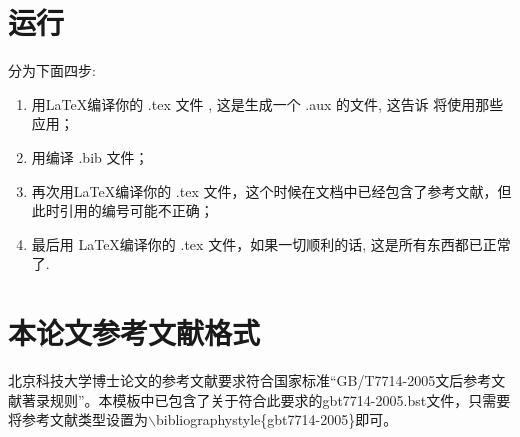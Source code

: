 \section{运行 \BibTeX}
分为下面四步:
\begin{enumerate}
\item 用LaTeX编译你的 .tex 文件 , 这是生成一个 .aux 的文件, 这告诉 \BibTeX 将使用那些应用；
\item 用\BibTeX 编译 .bib 文件；
\item 再次用\LaTeX 编译你的 .tex 文件，这个时候在文档中已经包含了参考文献，但此时引用的编号可能不正确；
\item 最后用 \LaTeX 编译你的 .tex 文件，如果一切顺利的话, 这是所有东西都已正常了.
\end{enumerate}

\section{本论文参考文献格式}
北京科技大学博士论文的参考文献要求符合国家标准“GB/T7714-2005文后参考文献著录规则”。本模板中已包含了关于符合此要求的gbt7714-2005.bst文件，只需要将参考文献类型设置为$\backslash$bibliographystyle\{gbt7714-2005\}即可。

